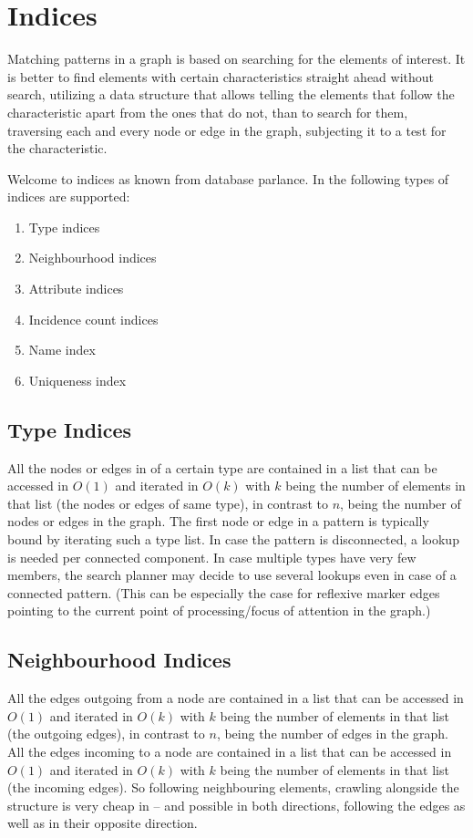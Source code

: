 \chapter{Indices}\label{cha:indices} 

Matching patterns in a graph is based on searching for the elements of interest.
It is better to find elements with certain characteristics straight ahead without search,
utilizing a data structure that allows telling the elements that follow the characteristic apart from the ones that do not,
than to search for them, traversing each and every node or edge in the graph, subjecting it to a test for the characteristic.

Welcome to indices as known from database parlance.
In \GrG{} the following types of indices are supported:
\begin{enumerate}
	\item Type indices
	\item Neighbourhood indices
	\item Attribute indices
	\item Incidence count indices
	\item Name index
	\item Uniqueness index
\end{enumerate}

\section{Type Indices}\label{sec:typeindices}
All the nodes or edges in \GrG{} of a certain type are contained in a list that can be accessed in $O(1)$ and iterated in $O(k)$ with $k$ being the number of elements in that list (the nodes or edges of same type), in contrast to $n$, being the number of nodes or edges in the graph.
The first node or edge in a pattern is typically bound by iterating such a type list.
In case the pattern is disconnected, a lookup is needed per connected component.
In case multiple types have very few members, the search planner may decide to use several lookups even in case of a connected pattern.
(This can be especially the case for reflexive marker edges pointing to the current point of processing/focus of attention in the graph.)

\section{Neighbourhood Indices}\label{sec:neighbourhoodindices}
All the edges outgoing from a node are contained in a list that can be accessed in $O(1)$ and iterated in $O(k)$ with $k$ being the number of elements in that list (the outgoing edges), in contrast to $n$, being the number of edges in the graph.
All the edges incoming to a node are contained in a list that can be accessed in $O(1)$ and iterated in $O(k)$ with $k$ being the number of elements in that list (the incoming edges).
So following neighbouring elements, crawling alongside the structure is very cheap in \GrG{ } -- and possible in both directions, following the edges as well as in their opposite direction.

